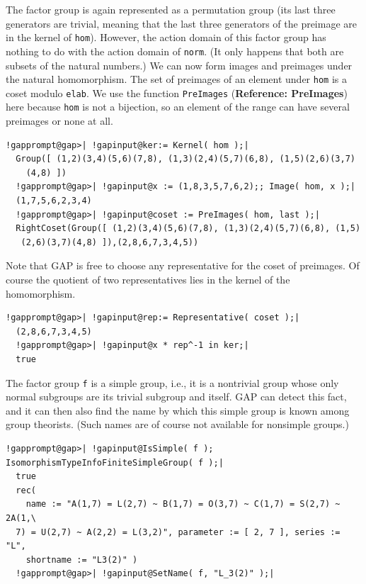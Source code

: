 \documentclass[a4paper,11pt]{report}
\begin{document}
{{ The factor group is again represented as a permutation group (its last three
generators are trivial, meaning that the last three generators of the preimage
are in the kernel of \texttt{hom}). However, the action domain of this factor group has nothing to do with the
action domain of \texttt{norm}. (It only happens that both are subsets of the natural numbers.) We can now
form images and preimages under the natural homomorphism. The set of preimages
of an element under \texttt{hom} is a coset modulo \texttt{elab}. We use the function \texttt{PreImages} (\textbf{Reference: PreImages}) here because \texttt{hom} is not a bijection, so an element of the range can have several preimages or
none at all. 

 
\begin{Verbatim}[commandchars=!@|,fontsize=\small,frame=single,label=Example]
  !gapprompt@gap>| !gapinput@ker:= Kernel( hom );|
  Group([ (1,2)(3,4)(5,6)(7,8), (1,3)(2,4)(5,7)(6,8), (1,5)(2,6)(3,7)
    (4,8) ])
  !gapprompt@gap>| !gapinput@x := (1,8,3,5,7,6,2);; Image( hom, x );|
  (1,7,5,6,2,3,4)
  !gapprompt@gap>| !gapinput@coset := PreImages( hom, last );|
  RightCoset(Group([ (1,2)(3,4)(5,6)(7,8), (1,3)(2,4)(5,7)(6,8), (1,5)
   (2,6)(3,7)(4,8) ]),(2,8,6,7,3,4,5))
\end{Verbatim}
 

 Note that \textsf{GAP} is free to choose any representative for the coset of preimages. Of course the
quotient of two representatives lies in the kernel of the homomorphism. 

 
\begin{Verbatim}[commandchars=!@|,fontsize=\small,frame=single,label=Example]
  !gapprompt@gap>| !gapinput@rep:= Representative( coset );|
  (2,8,6,7,3,4,5)
  !gapprompt@gap>| !gapinput@x * rep^-1 in ker;|
  true
\end{Verbatim}
 

 The factor group \texttt{f} is a simple group, i.e., it is a non\texttt{}trivial group whose
only normal subgroups are its trivial subgroup and itself. \textsf{GAP} can detect this fact, and it can then also find the name by which this simple
group is known among group theorists. (Such names are of course not available
for non\texttt{}simple groups.) 

 
\begin{Verbatim}[commandchars=!@|,fontsize=\small,frame=single,label=Example]
  !gapprompt@gap>| !gapinput@IsSimple( f ); IsomorphismTypeInfoFiniteSimpleGroup( f );|
  true
  rec(
    name := "A(1,7) = L(2,7) ~ B(1,7) = O(3,7) ~ C(1,7) = S(2,7) ~ 2A(1,\
  7) = U(2,7) ~ A(2,2) = L(3,2)", parameter := [ 2, 7 ], series := "L",
    shortname := "L3(2)" )
  !gapprompt@gap>| !gapinput@SetName( f, "L_3(2)" );|
\end{Verbatim}
 

}}
\end{document}
